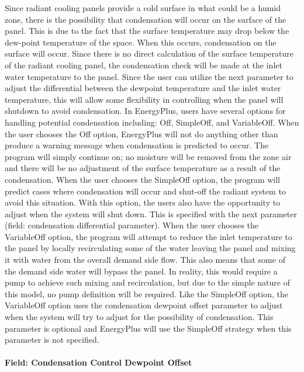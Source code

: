 Since radiant cooling panels provide a cold surface in what could be a humid zone, there is the possibility that condensation will occur on the surface of the panel. This is due to the fact that the surface temperature may drop below the dew-point temperature of the space. When this occurs, condensation on the surface will occur. Since there is no direct calculation of the surface temperature of the radiant cooling panel, the condensation check will be made at the inlet water temperature to the panel. Since the user can utilize the next parameter to adjust the differential between the dewpoint temperature and the inlet water temperature, this will allow some flexibility in controlling when the panel will shutdown to avoid condensation. In EnergyPlus, users have several options for handling potential condensation including: Off, SimpleOff, and VariableOff. When the user chooses the Off option, EnergyPlus will not do anything other than produce a warning message when condensation is predicted to occur. The program will simply continue on; no moisture will be removed from the zone air and there will be no adjustment of the surface temperature as a result of the condensation. When the user chooses the SimpleOff option, the program will predict cases where condensation will occur and shut-off the radiant system to avoid this situation. With this option, the users also have the opportunity to adjust when the system will shut down. This is specified with the next parameter (field: condensation differential parameter). When the user chooses the VariableOff option, the program will attempt to reduce the inlet temperature to the panel by locally recirculating some of the water leaving the panel and mixing it with water from the overall demand side flow.  This also means that some of the demand side water will bypass the panel. In reality, this would require a pump to achieve such mixing and recirculation, but due to the simple nature of this model, no pump definition will be required. Like the SimpleOff option, the VariableOff option uses the condensation dewpoint offset parameter to adjust when the system will try to adjust for the possibility of condensation. This parameter is optional and EnergyPlus will use the SimpleOff strategy when this parameter is not specified.

\paragraph{Field: Condensation Control Dewpoint Offset}\label{field-condensation-control-dewpoint-offset}

